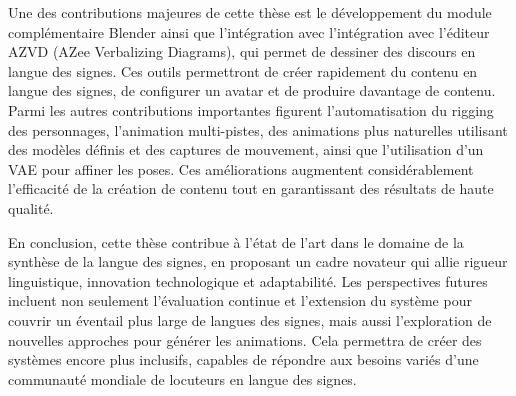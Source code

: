 \documentclass[a4paper,12pt]{report}
\begin{document}
Une des contributions majeures de cette thèse est le développement du module complémentaire Blender ainsi que l'intégration avec l’intégration avec l'éditeur AZVD (AZee Verbalizing Diagrams), qui permet de dessiner des discours en langue des signes. Ces outils permettront de créer rapidement du contenu en langue des signes, de configurer un avatar et de produire davantage de contenu. Parmi les autres contributions importantes figurent l'automatisation du rigging des personnages, l’animation multi-pistes, des animations plus naturelles utilisant des modèles définis et des captures de mouvement, ainsi que l'utilisation d'un VAE pour affiner les poses. Ces améliorations augmentent considérablement l'efficacité de la création de contenu tout en garantissant des résultats de haute qualité.

En conclusion, cette thèse contribue à l’état de l’art dans le domaine de la synthèse de la langue des signes, en proposant un cadre novateur qui allie rigueur linguistique, innovation technologique et adaptabilité. Les perspectives futures incluent non seulement l’évaluation continue et l’extension du système pour couvrir un éventail plus large de langues des signes, mais aussi l’exploration de nouvelles approches pour générer les animations. Cela permettra de créer des systèmes encore plus inclusifs, capables de répondre aux besoins variés d’une communauté mondiale de locuteurs en langue des signes.
\end{document}
